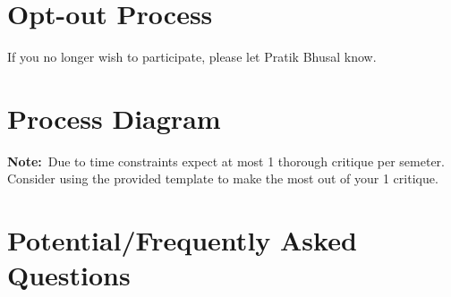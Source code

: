 \documentclass[letterpaper, 12pt]{article}
\newcommand{\note}[1]{\textbf{Note:}~#1}
\begin{document}
\section{Opt-out Process}

If you no longer wish to participate, please let Pratik Bhusal know.

\section{Process Diagram}

\begin{center}
    \label{fig:process}
\end{center}

\note{Due to time constraints expect at most 1 thorough critique per semeter.
Consider using the provided template to make the most out of your 1 critique.}

\section{Potential/Frequently Asked Questions}
\end{document}
